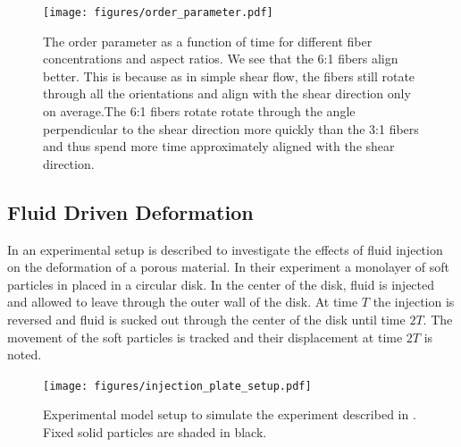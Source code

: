 \documentclass[preprint, 10pt]{elsarticle}
\begin{document}
\begin{figure}[!h]
\begin{center}
\texttt{[image: figures/order\_parameter.pdf]}\\
\end{center}
\caption{The order parameter as a function of time for different fiber concentrations and aspect ratios. We see that the 6:1 fibers align better. This is because as in simple shear flow, the fibers still rotate through all the orientations and align with the shear direction only on average.The 6:1 fibers rotate rotate through the angle perpendicular to the shear direction more quickly than the 3:1 fibers and thus spend more time approximately aligned with the shear direction. }\label{fig:angles}
\end{figure} 



\FloatBarrier
\subsection{Fluid Driven Deformation}

In \cite{MacMinn2015} an experimental setup is described to investigate the
effects of fluid injection on the deformation of a porous material. In their
experiment a monolayer of soft particles in placed in a circular disk. In the
center of the disk, fluid is injected and allowed to leave through the outer
wall of the disk. At time $T$ the injection is reversed and fluid is sucked out
through the center of the disk until time $2T$. The movement of the soft
particles is tracked and their displacement at time $2T$ is noted.

\begin{figure}[h!]
\begin{center}
\texttt{[image: figures/injection\_plate\_setup.pdf]}
\end{center}
\caption{Experimental model setup to simulate the experiment described in
\cite{MacMinn2015}. Fixed solid particles are shaded in
black.}\label{fig:radial}
\end{figure}
\end{document}
